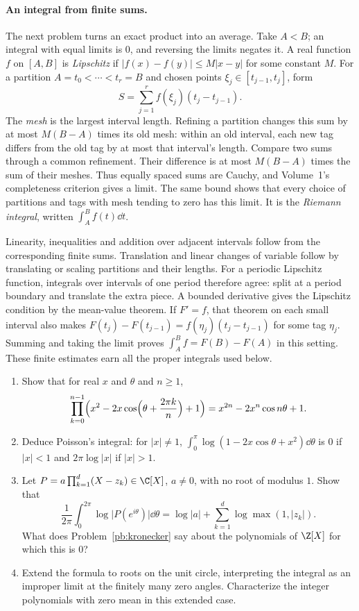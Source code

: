 \paragraph{An integral from finite sums.}\label{tool:workshop-integral}
The next problem turns an exact product into an average. Take $A<B$; an integral with equal limits is $0$, and reversing the limits negates it. A real function $f$ on $[A,B]$ is \emph{Lipschitz} if
$|f(x)-f(y)|\le M|x-y|$ for some constant $M$.
For a partition $A=t_0<\cdots<t_r=B$ and chosen points
$\xi_j\in[t_{j-1},t_j]$, form
\[
S=\sum_{j=1}^r f(\xi_j)(t_j-t_{j-1}).
\]
The \emph{mesh} is the largest interval length. Refining a partition changes
this sum by at most $M(B-A)$ times its old mesh: within an old interval,
each new tag differs from the old tag by at most that interval's length.
Compare two sums through a common refinement. Their difference is at most
$M(B-A)$ times the sum of their meshes. Thus equally spaced sums are Cauchy,
and Volume~1's completeness criterion gives a limit. The same bound shows
that every choice of partitions and tags with mesh tending to zero has this
limit. It is the \emph{Riemann integral}, written $\int_A^B f(t)\dd t$.

Linearity, inequalities and addition over adjacent intervals follow from
the corresponding finite sums. Translation and linear changes of variable
follow by translating or scaling partitions and their lengths.
For a periodic Lipschitz function, integrals over intervals of one period
therefore agree: split at a period boundary and translate the extra piece.
A bounded derivative gives the Lipschitz condition by the mean-value theorem.
If $F'=f$, that theorem on each small interval also makes
$F(t_j)-F(t_{j-1})=f(\eta_j)(t_j-t_{j-1})$ for some tag $\eta_j$.
Summing and taking the limit proves $\int_A^B f=F(B)-F(A)$ in this setting.
These finite estimates earn all the proper integrals used below.

\begin{exercise}[$\star\star\star$]\label{pb:jensen}
\begin{enumerate}[label=(\alph*)]
\item Show that for real $x$ and $\theta$ and $n\ge1$,
\[
\prod_{k=0}^{n-1}\Bigl(x^2-2x\cos\Bigl(\theta+\frac{2\pi k}n\Bigr)+1\Bigr)=x^{2n}-2x^n\cos n\theta+1.
\]
\item Deduce Poisson's integral: for $|x|\ne1$, $\int_0^\pi\log(1-2x\cos\theta+x^2)\dd\theta$ is $0$ if $|x|<1$ and
$2\pi\log|x|$ if $|x|>1$.
\item Let $P=a\prod_{k=1}^d(X-z_k)\in\C[X]$, $a\ne0$, with no root of modulus $1$. Show that
\[
\frac1{2\pi}\int_0^{2\pi}\log\bigl|P(e^{i\theta})\bigr|\dd\theta=\log|a|+\sum_{k=1}^d\log\max(1,|z_k|).
\]
What does Problem~\ref{pb:kronecker} say about the polynomials of $\Z[X]$ for which this is $0$?
\item Extend the formula to roots on the unit circle, interpreting the integral as an improper limit at the finitely many zero angles. Characterize the integer polynomials with zero mean in this extended case.
\end{enumerate}
\end{exercise}


